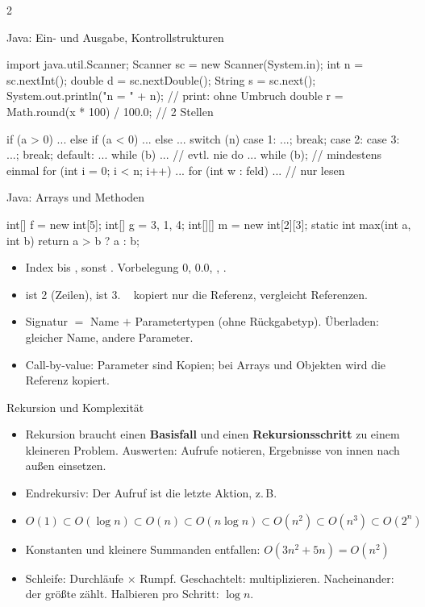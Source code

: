 \documentclass[fontsize=10pt,a4paper,DIV=20,headsepline]{scrartcl}
\newenvironment{kl}{\begin{itemize}[leftmargin=3mm, itemsep=0.1mm, topsep=0.3mm, parsep=0pt, label=\textcolor{diagramm}{\textbullet}]}{\end{itemize}}
\begin{document}
\begin{multicols}{2}
\begin{fs}{Java: Ein- und Ausgabe, Kontrollstrukturen}
\begin{fscode}
import java.util.Scanner;
Scanner sc = new Scanner(System.in);
int n = sc.nextInt();   double d = sc.nextDouble();
String s = sc.next();
System.out.println("n = " + n);    // print: ohne Umbruch
double r = Math.round(x * 100) / 100.0;   // 2 Stellen

if (a > 0) { ... } else if (a < 0) { ... } else { ... }
switch (n) {
	case 1: ...; break;
	case 2: case 3: ...; break;
	default: ...
}
while (b) { ... }        // evtl. nie
do { ... } while (b);    // mindestens einmal
for (int i = 0; i < n; i++) { ... }
for (int w : feld) { ... }  // nur lesen
\end{fscode}
\end{fs}

\begin{fs}{Java: Arrays und Methoden}
\begin{fscode}
int[] f = new int[5];   int[] g = {3, 1, 4};
int[][] m = new int[2][3];
static int max(int a, int b) { return a > b ? a : b; }
\end{fscode}
\begin{kl}
\item Index  bis , sonst . Vorbelegung 0, 0.0, , .
\item {} ist 2 (Zeilen),  ist 3. \  kopiert nur die Referenz,  vergleicht Referenzen.
\item Signatur $=$ Name $+$ Parametertypen (ohne Rückgabetyp). Überladen: gleicher Name, andere Parameter.
\item Call-by-value: Parameter sind Kopien; bei Arrays und Objekten wird die Referenz kopiert.
\end{kl}
\end{fs}

\begin{fs}{Rekursion und Komplexität}
\begin{kl}
\item Rekursion braucht einen \textbf{Basisfall} und einen \textbf{Rekursionsschritt} zu einem kleineren Problem. Auswerten: Aufrufe notieren, Ergebnisse von innen nach außen einsetzen.
\item Endrekursiv: Der Aufruf ist die letzte Aktion, z.\,B. 
\item $O(1) \subset O(\log n) \subset O(n) \subset O(n \log n) \subset O(n^2) \subset O(n^3) \subset O(2^n)$
\item Konstanten und kleinere Summanden entfallen: $O(3n^2 + 5n) = O(n^2)$
\item Schleife: Durchläufe $\times$ Rumpf. Geschachtelt: multiplizieren. Nacheinander: der größte zählt. Halbieren pro Schritt: $\log n$.
\end{kl}
\end{fs}


\end{multicols}
\end{document}
